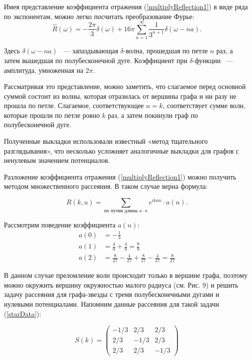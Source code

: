 \documentclass[a4 paper, 12 pt]{extarticle}
\begin{document}
   Имея представление коэффициента отражения (\ref{multiplyReflection1}) в виде ряда по экспонентам, можно легко посчитать преобразование Фурье:
   \[\widehat{R}(\omega)=-\frac{2\pi}{3}\delta(\omega)+16\pi\sum_{n=1}^{\infty}\frac{1}{3^{n+1}}\delta(\omega-na).\]
   
   Здесь $\delta\left(\omega -na\right)$ ~--- запаздывающая $\delta$-волна, прошедшая по петле $n$ раз, а затем вышедшая по полубесконечной дуге. Коэффициент при $\delta$-функции ~--- амплитуда, умноженная на $2\pi$.
   
   Рассматривая это представление, можно заметить, что слагаемое перед основной суммой состоит из волны, которая отразилась от вершины графа и ни разу не прошла по петле. Слагаемое, соответствующее $n=k$, соответствует сумме волн, которые прошли по петле ровно $k$ раз, а затем покинули граф по полубесконечной дуге.
   
   Полученные выкладки использовали известный «метод тщательного разглядывания», что несколько усложняет аналогичные выкладки для графов с ненулевым значением потенциалов.
   
   Разложение коэффициента отражения (\ref{multiplyReflection1}) можно получить методом множественного рассеяния. В таком случае верна формула:
   
   \begin{equation}
   \label{multiple}
   R\left(k,u\right) = \sum_{\text{по путям длины $a \cdot n$}} e^{ikan} \cdot a\left(n\right).
   \end{equation}
   
   Рассмотрим поведение коэффициента $a\left(n\right)$:
   \[\begin{aligned}
   a(0) &= -\frac{1}{3} \\
   a(1) &= \frac{4}{9} + \frac{4}{9} = \frac{8}{9} \\
   a(2) &= \frac{8}{27} - \frac{4}{27} + \frac{8}{27} - \frac{4}{27} =  \frac{8}{27}
   \end{aligned}\]
   
   В данном случае преломление волн происходит только в вершине графа, поэтому можно окружить вершину окружностью малого радиуса (см. Рис. 9) и решить задачу рассеяния для графа-звезды с тремя полубесконечными дугами и нулевыми потенциалами. Напомним данные рассеяния для такой задачи (\ref{starData}):
   
   \[
   S(k)=
   \begin{pmatrix}
   -1/3 & 2/3 & 2/3 \\
   2/3 & -1/3 & 2/3 \\
   2/3 & 2/3 & -1/3 
   \end{pmatrix}\]
   
\end{document}
